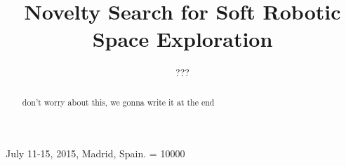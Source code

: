 \documentclass{sig-alternate}
\begin{document}
  {July 11-15, 2015, Madrid, Spain.}
    \widowpenalty = 10000

\title{Novelty Search for Soft Robotic Space Exploration}

\author{
\alignauthor
???
}

\maketitle
\begin{abstract}
don't worry about this, we gonna write it at the end
\end{abstract}
\end{document}
